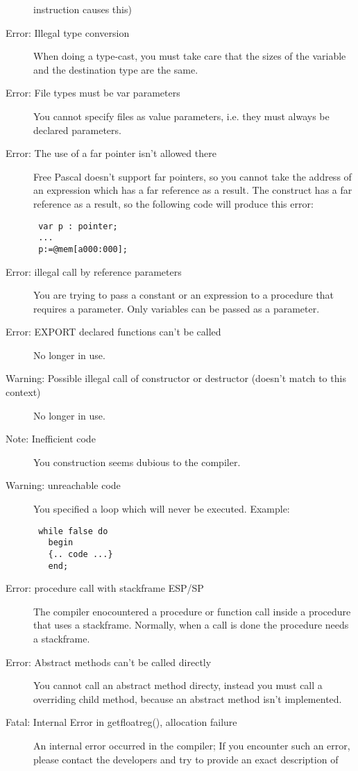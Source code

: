 \begin{description}
 instruction causes this)
\item [Error: Illegal type conversion]
 When doing a type-cast, you must take care that the sizes of the variable and
 the destination type are the same. 
\item [Error: File types must be var parameters]
 You cannot specify files as value parameters, i.e. they must always be
 declared  parameters.
\item [Error: The use of a far pointer isn't allowed there]
 Free Pascal doesn't support far pointers, so you cannot take the address of
 an expression which has a far reference as a result. The  construct
 has a far reference as a result, so the following code will produce this
 error:
 \begin{verbatim}
 var p : pointer;
 ...
 p:=@mem[a000:000];
 \end{verbatim}
\item [Error: illegal call by reference parameters]
 You are trying to pass a constant or an expression to a procedure that
 requires a  parameter. Only variables can be passed as a 
 parameter.
\item [Error: EXPORT declared functions can't be called]
 No longer in use.
\item [Warning: Possible illegal call of constructor or destructor (doesn't match to this context)]
 No longer in use.
\item [Note: Inefficient code]
 You construction seems dubious to the compiler.
\item [Warning: unreachable code]
 You specified a loop which will never be executed. Example:
 \begin{verbatim}
 while false do
   begin
   {.. code ...}
   end;
 \end{verbatim}
\item [Error: procedure call with stackframe ESP/SP]
 The compiler enocountered a procedure  or function call inside a 
 procedure that uses a  stackframe. Normally, when a call is
 done the procedure needs a  stackframe.
\item [Error: Abstract methods can't be called directly]
 You cannot call an abstract method directy, instead you must call a
 overriding child method, because an abstract method isn't implemented. 
\item [Fatal: Internal Error in getfloatreg(), allocation failure]
 An internal error occurred in the compiler; If you encounter such an error,
 please contact the developers and try to provide  an exact description of

\end{description}
